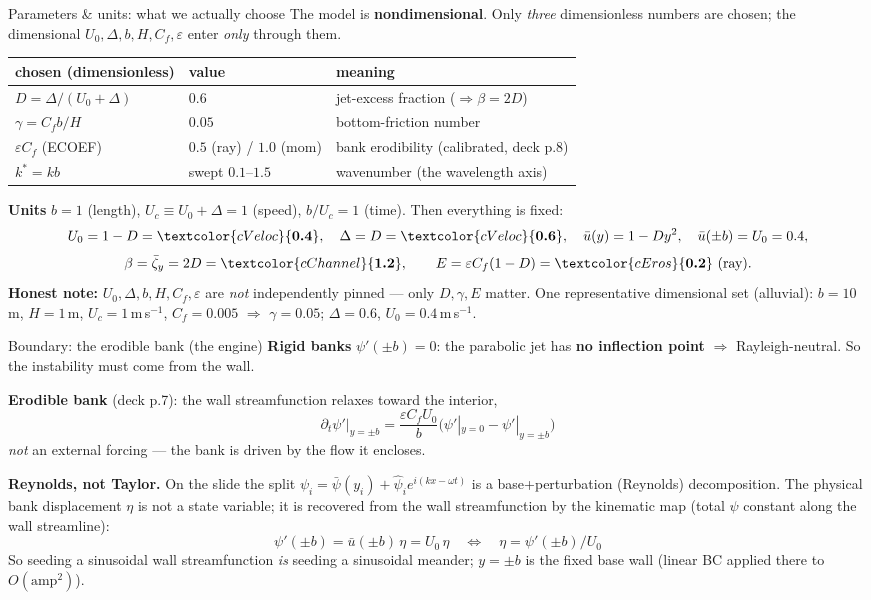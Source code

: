 \documentclass[aspectratio=169,10pt]{beamer}
\newcommand{\hl}[2]{\textcolor{#1}{\textbf{#2}}}
\newcommand{\pp}{\psi'}
\newcommand{\pb}{\bar\psi}
\newcommand{\ub}{\bar u}
\newcommand{\dt}{\partial_t}
\begin{document}
\begin{frame}{Parameters \& units: what we actually choose}
The model is \hl{cChannel}{nondimensional}. Only \emph{three} dimensionless
numbers are chosen; the dimensional $U_0,\Delta,b,H,C_f,\varepsilon$ enter
\emph{only} through them.
\begin{center}\footnotesize
\begin{tabular}{@{}lll@{}}
\toprule
chosen (dimensionless) & value & meaning\\
\midrule
$D=\Delta/(U_0+\Delta)$ & $0.6$ & jet-excess fraction ($\Rightarrow \beta=2D$)\\
$\gamma=C_f b/H$ & $0.05$ & bottom-friction number\\
$\varepsilon C_f$ (ECOEF) & $0.5$ (ray) / $1.0$ (mom) & bank erodibility (calibrated, deck p.8)\\
$k^*=kb$ & swept $0.1$--$1.5$ & wavenumber (the wavelength axis)\\
\bottomrule
\end{tabular}
\end{center}
\textbf{Units} $b=1$ (length), $U_c\equiv U_0+\Delta=1$ (speed), $b/U_c=1$ (time).
Then everything is fixed:
\[
U_0=1-D=\hl{cVeloc}{0.4},\quad \Delta=D=\hl{cVeloc}{0.6},\quad
\bar u(y)=1-Dy^2,\quad \bar u(\pm b)=U_0=0.4,
\]
\[
\beta=\bar\zeta_y=2D=\hl{cChannel}{1.2},\qquad E=\varepsilon C_f(1-D)=\hl{cEros}{0.2}\ (\text{ray}).
\]
\footnotesize \hl{cEros}{Honest note:} $U_0,\Delta,b,H,C_f,\varepsilon$ are \emph{not}
independently pinned --- only $D,\gamma,E$ matter. One representative dimensional
set (alluvial): $b=10$\,m, $H=1$\,m, $U_c=1$\,m\,s$^{-1}$, $C_f=0.005$ $\Rightarrow$
$\gamma=0.05$; $\Delta=0.6$, $U_0=0.4$\,m\,s$^{-1}$.
\end{frame}

\begin{frame}{Boundary: the erodible bank (the engine)}
\textbf{Rigid banks} $\pp(\pm b)=0$: the parabolic jet has \hl{cEros}{no inflection point}
$\Rightarrow$ Rayleigh-neutral. So the instability must come from the wall.
\smallskip

\textbf{Erodible bank} (deck p.7): the wall streamfunction relaxes toward the interior,
\[
\boxed{\;\dt\pp\big|_{y=\pm b}=\frac{\varepsilon C_fU_0}{b}\big(\pp|_{y=0}-\pp|_{y=\pm b}\big)\;}
\]
\emph{not} an external forcing --- the bank is driven by the flow it encloses.
\smallskip

\textbf{Reynolds, not Taylor.} On the slide the split $\psi_i=\pb(y_i)+\hat\psi_i e^{i(kx-\omega t)}$
is a base+perturbation (Reynolds) decomposition. The physical bank displacement
$\eta$ is not a state variable; it is recovered from the wall streamfunction by the
kinematic map (total $\psi$ constant along the wall streamline):
\[
\boxed{\;\pp(\pm b)=\ub(\pm b)\,\eta=U_0\,\eta\quad\Longleftrightarrow\quad \eta=\pp(\pm b)/U_0\;}
\]
\footnotesize So seeding a sinusoidal wall streamfunction \emph{is} seeding a sinusoidal meander; $y=\pm b$ is the fixed base wall (linear BC applied there to $O(\text{amp}^2)$).
\end{frame}
\end{document}
